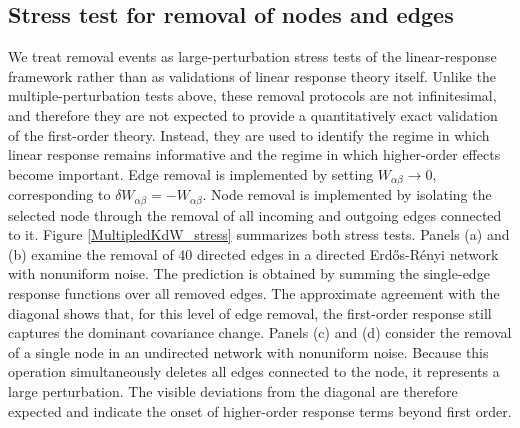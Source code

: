 \subsection{Stress test for removal of nodes and edges}
\quad We treat removal events as large-perturbation stress tests of the linear-response framework rather than as validations of linear response theory itself. Unlike the multiple-perturbation tests above, these removal protocols are not infinitesimal, and therefore they are not expected to provide a quantitatively exact validation of the first-order theory. Instead, they are used to identify the regime in which linear response remains informative and the regime in which higher-order effects become important. Edge removal is implemented by setting \(W_{\alpha\beta}\to 0\), corresponding to \(\delta W_{\alpha\beta}=-W_{\alpha\beta}\). Node removal is implemented by isolating the selected node through the removal of all incoming and outgoing edges connected to it. Figure \ref{MultipledKdW_stress} summarizes both stress tests. Panels (a) and (b) examine the removal of 40 directed edges in a directed Erd\H{o}s-R\'enyi network with nonuniform noise. The prediction is obtained by summing the single-edge response functions over all removed edges. The approximate agreement with the diagonal shows that, for this level of edge removal, the first-order response still captures the dominant covariance change. Panels (c) and (d) consider the removal of a single node in an undirected network with nonuniform noise. Because this operation simultaneously deletes all edges connected to the node, it represents a large perturbation. The visible deviations from the diagonal are therefore expected and indicate the onset of higher-order response terms beyond first order.
